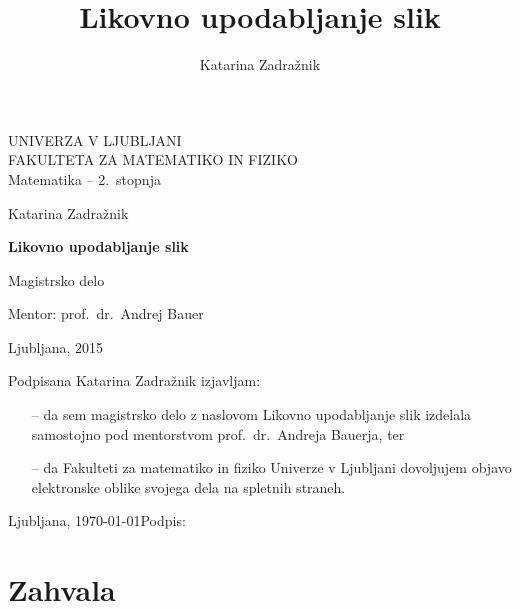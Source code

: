 \documentclass[11pt,a4paper,twoside,slovene]{book}
\author{Katarina Zadražnik}
\title{Likovno upodabljanje slik}
\begin{document}
\frontmatter
\pagestyle{empty}

\begin{flushleft}
\noindent
\textsc{\Large UNIVERZA V LJUBLJANI}\\
\textsc{\Large FAKULTETA ZA MATEMATIKO IN FIZIKO}\\
\medskip
\Large Matematika -- 2.\ stopnja
\end{flushleft}

\vfill

\begin{center}
 {\LARGE Katarina Zadražnik}

  \bigskip
  \medskip
  {\bfseries {\Huge Likovno upodabljanje slik}}

  \bigskip
  \medskip

  {\LARGE Magistrsko delo}
  
  \bigskip
  \medskip
  
  {\Large Mentor: prof.\ dr.\ Andrej Bauer}
\end{center}

\vfill
\vfill
\noindent
{\Large Ljubljana, 2015}

\cleardoublepage

\null
\vfill
\noindent Podpisana {Katarina Zadražnik} izjavljam: %
\begin{itemize}
 \item[--] da sem magistrsko delo z naslovom Likovno upodabljanje slik izdelala samostojno pod mentorstvom {prof.\ dr.\ Andreja Bauerja}, ter %
 \item[--] da Fakulteti za matematiko in fiziko Univerze v Ljubljani dovoljujem objavo elektronske oblike svojega dela na spletnih straneh.
\end{itemize}
Ljubljana, \today \hfill Podpis:\hspace{5cm} %

\cleardoublepage

\chapter*{Zahvala}
\end{document}
